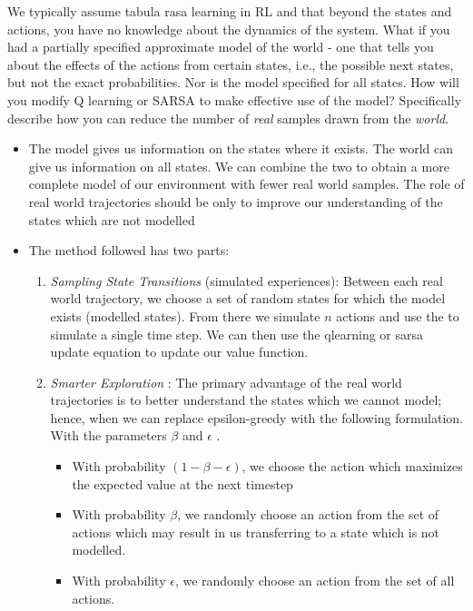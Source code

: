 \documentclass[addpoints,12pt,solution]{exam}
\begin{document}
\begin{questions}
        \question[5] We typically assume tabula rasa learning in RL and that beyond the states and actions, you have no knowledge about the dynamics of the system. What if you had a partially specified approximate model of the world - one that tells you about the effects of the actions from certain states, i.e., the possible next states, but not the exact probabilities. Nor is the model specified for all states. How will you modify Q learning or SARSA to make effective use of the model? Specifically describe how you can reduce the number of \textit{real} samples drawn from the \textit{world}.
        \begin{solution}
            \begin{itemize}
                \item The model gives us information on the states where it exists. The world
                can give us information on all states. We can combine the two to obtain a more complete model of our
                environment with fewer real world samples. The role of real world trajectories should be only to
                improve our understanding of the states which are not modelled
                \item The method followed has two parts:
                \begin{enumerate}
                    \item \emph{Sampling State Transitions} (simulated experiences): Between each real world trajectory, we choose a set of random
                    states for which the model exists (modelled states). From there we simulate $n$ actions and use
                    the to simulate a single time step. We can then use the qlearning or sarsa update equation to
                    update our value function.
                    \item \emph{Smarter Exploration} : The primary advantage of the real world trajectories is to
                    better understand the states which we cannot model; hence, when we can replace epsilon-greedy with
                    the following formulation.
                    With the parameters $\beta$ and $\epsilon$ .
                    \begin{itemize}
                        \item With probability $(1-\beta - \epsilon)$, we choose the action which maximizes the expected value at the next timestep
                        \item With probability $\beta$, we randomly choose an action from the set of actions which may result in us transferring to a state which is not modelled.
                        \item With probability $\epsilon$, we randomly choose an action from the set of all actions.
                    \end{itemize}
                \end{enumerate}


\end{itemize}
\end{solution}
\end{questions}
\end{document}
